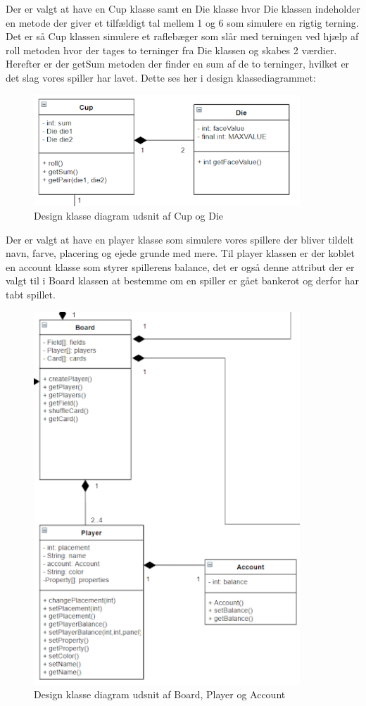 Der er valgt at have en Cup klasse samt en Die klasse hvor Die klassen indeholder en metode der giver et tilfældigt tal mellem 1 og 6 som simulere en rigtig terning. Det er så Cup klassen simulere et raflebæger som slår med terningen ved hjælp af roll metoden hvor der tages to terninger fra Die klassen og skabes 2 værdier. Herefter er der getSum metoden der finder en sum af de to terninger, hvilket er det slag vores spiller har lavet. Dette ses her i design klassediagrammet:
\begin{figure}[H]
    \includegraphics[width=10cm]{figures/Design klasse diagram Cup Die}
    \caption{Design klasse diagram udsnit af Cup og Die}
\end{figure}
Der er valgt at have en player klasse som simulere vores spillere der bliver tildelt navn, farve, placering og ejede grunde med mere. Til player klassen er der koblet en account klasse som styrer spillerens balance, det er også denne attribut der er valgt til i Board klassen at bestemme om en spiller er gået bankerot og derfor har tabt spillet.
\begin{figure}[H]
    \includegraphics[width=10cm]{figures/Design klasse diagram Board Player Account}
    \caption{Design klasse diagram udsnit af Board, Player og Account}
\end{figure}
